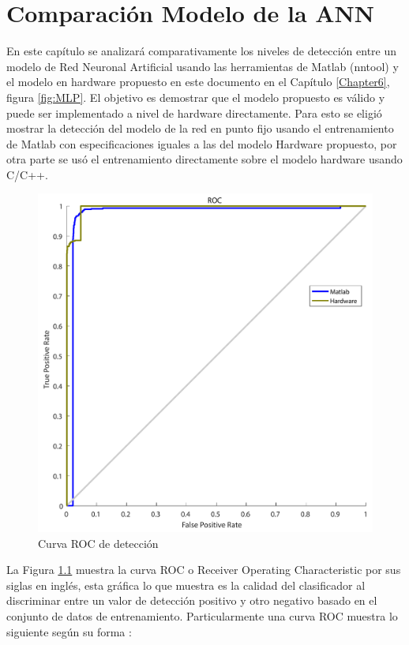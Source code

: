 
\chapter{Comparación Modelo de la ANN} %
\label{Chapter12}

En este capítulo se analizará comparativamente los niveles de detección entre un modelo de Red Neuronal Artificial usando las herramientas de Matlab (nntool) y el modelo en hardware propuesto en este documento en el Capítulo \ref{Chapter6}, figura \ref{fig:MLP}. El objetivo es demostrar que el modelo propuesto es válido y puede ser implementado a nivel de hardware directamente. Para esto se eligió mostrar la detección del modelo de la red en punto fijo usando el entrenamiento de Matlab con especificaciones iguales a las del modelo Hardware propuesto, por otra parte se usó el entrenamiento directamente sobre el modelo hardware usando C/C++.

\begin{figure}[H]
	\centering
		\includegraphics[scale=0.35]{./Figures/ROCANN}
	\caption{Curva ROC de detección}
	\label{fig:ROC}
\end{figure}

 La Figura \ref{fig:ROC} muestra la curva ROC o Receiver Operating Characteristic por sus siglas en inglés, esta gráfica lo que muestra es la calidad del clasificador al discriminar entre un valor de detección positivo y otro negativo basado en el conjunto de datos de entrenamiento. Particularmente una curva ROC muestra lo siguiente según su forma \citep{ROCCurve}:
 
